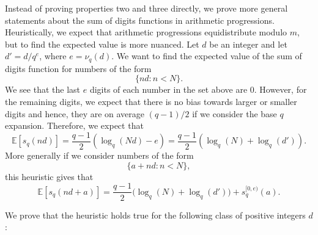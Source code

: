 \documentclass[12pt]{amsart}
\theoremstyle{definition}
\numberwithin{equation}{section}
\numberwithin{equation}{section}
\begin{document}
Instead of proving properties two and three directly, we prove more general statements about the sum of digits functions in arithmetic progressions. Heuristically, we expect that arithmetic progressions equidistribute modulo $m$, but to find the expected value is more nuanced.
Let $d$ be an integer and let $d'=d/q^e$, where $e=\nu_q(d)$. We want to find the expected value of the sum of digits function for numbers of the form
\[
    \{nd:n<N\}.
\]
We see that the last $e$ digits of each number in the set above are 0. However, for the remaining digits, we expect that there is no bias towards larger or smaller digits and hence, they are on average $(q-1)/2$ if we consider the base $q$ expansion. Therefore, we expect that
\begin{equation}
	\mathbb{E}[s_q(nd)] = \frac{q-1}{2}(\log_q(Nd)-e) = \frac{q-1}{2}(\log_q(N) + \log_q(d')).
\end{equation}
More generally if we consider numbers of the form
\[
\{a+nd:n<N\},
\]
this heuristic gives that
\begin{equation}
	\mathbb{E}[s_q(nd+a)] = \frac{q-1}{2}\big(\log_q(N) + \log_q(d')\big) +s_q^{[0,e)}(a).
\end{equation}

We prove that the heuristic holds true for the following class of positive integers $d$:
\end{document}
